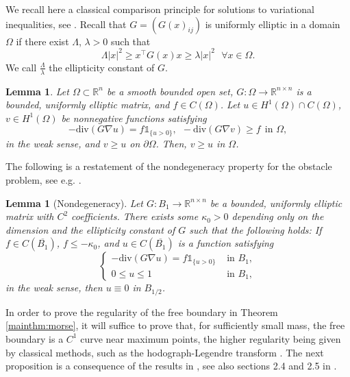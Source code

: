 \documentclass[10pt,a4paper]{article}
\newcommand{\RR}{\mathbb{R}}
\newcommand{\divg}{\mathrm{div}}
\newcommand{\faskip}{\hspace{8pt}}
\newtheorem{lem}[thm]{Lemma}
\numberwithin{equation}{section}
\begin{document}
We recall here a classical comparison principle for solutions to variational inequalities, see \cite[Theorem 2.6.4]{KS80}. Recall that $ G = (G(x)_{ij}) $ is uniformly elliptic in a domain $ \Omega $ if there exist $ \Lambda $, $ \lambda >0 $ such that
\[\Lambda |x|^{2} \geq x^{\top}G(x)x \geq \lambda |x|^{2} \faskip \forall x\in \Omega.\]
We call $ \frac{\Lambda}{\lambda} $ the ellipticity constant of $ G $.
\begin{lem}
	\label{lem:mp}
	Let $\Omega \subset \RR^{n}$ be a smooth bounded open set, $G: \Omega \rightarrow \RR^{n \times n}$ is a bounded, uniformly elliptic matrix, and $f\in C(\Omega)$. Let $u \in H^{1}(\Omega) \cap C(\Omega)$, $v \in H^{1}(\Omega)$ be nonnegative functions satisfying 
	\[
		- \divg(G\nabla u) = f\mathbb{1}_{\{u>0\}}, ~~ -\divg(G\nabla v)\geq f ~~ \text{in } \Omega,
	\]
	in the weak sense, and $v\geq u$ on $\partial \Omega$. Then, $v\geq u$ in $\Omega$. 
\end{lem}

The following is a restatement of the nondegeneracy property for the obstacle problem, see e.g. \cite[Lemma 2.3.1]{Fri82}. 
\begin{lem}[Nondegeneracy]
	\label{lem:nondeg}
	Let $G: B_1 \rightarrow \RR^{n \times n}$ be a bounded, uniformly elliptic matrix with $C^2$ coefficients. There exists some $\kappa_0 > 0$ depending only on the dimension and the ellipticity constant of $G$ such that the following holds: If $f \in C(\overline{B_1})$, $f \leq -\kappa_0$, and $u \in C(\overline{B_1})$ is a function satisfying 
	\[
	\begin{cases}
		-\divg(G\nabla u) = f\mathbb{1}_{\{u > 0\}} & \text{ in } B_1, \\
		0 \leq u \leq 1 & \text{ in } B_1,	
	\end{cases}
	\]
	in the weak sense, then $u \equiv 0$ in $B_{1/2}$.
\end{lem}

In order to prove the regularity of the free boundary in Theorem \ref{mainthm:morse}, it will suffice to prove that, for sufficiently small mass, the free boundary is a $ C^1 $ curve near maximum points, the higher regularity being given by classical methods, such as the hodograph-Legendre transform \cite[Section 2.2]{Fri82}. The next proposition is a consequence of the results in \cite{Caf77}, see also sections 2.4 and 2.5 in \cite{Fri82}.
\end{document}
